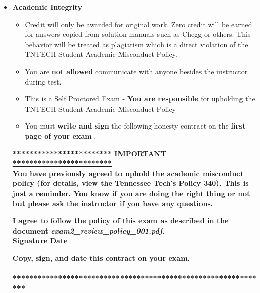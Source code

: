 \documentclass[11pt]{article}
\newcommand{\EXAMNUM}{2\hspace{0mm}}
\newcommand{\SECNUM}{001\hspace{0mm}}
\begin{document}
\begin{itemize}
\begin{itemize}
		\item  Pencil and scratch paper
			
	\end{itemize}

\newpage
		\item  \textbf{ \Large Academic Integrity}
\begin{itemize}

		\item {\B Credit will only be awarded for original work. Zero credit will be earned for answers copied from solution manuals such as Chegg or others. This behavior will be treated as plagiarism which is a direct violation of the TNTECH Student Academic Misconduct Policy.}

		\item  You are {\bf not allowed} communicate with anyone besides the instructor during test. 
		\item This is a Self Proctored Exam - {\bf You are responsible} for upholding the TNTECH Student Academic Misconduct Policy
		\item  You must {\bf write and sign} the following honesty contract on the {\bf first page of your exam }. 
		
		

\end{itemize}


 {\R  \bf \underline{************************ IMPORTANT ************************}} \vspace{3mm}\\
			  {\R \bf You have previously agreed to uphold the academic misconduct policy (for details, view the
Tennessee Tech's Policy 340). This is just a reminder. You know if you are doing the right thing or not but please ask the instructor if you have any questions. }
\begin{framed}
	
	\vspace{3mm}	 \textbf{ I \underline{\hspace{50mm}} agree to follow the policy of this exam \vspc as described in the document {\it exam\EXAMNUM\_review\_policy\_\SECNUM.pdf}.  }\vspace{3mm}\\
		 \textbf{\Large Signature \underline{\hspace{80mm}} Date\underline{\hspace{20mm} }}\\

\end{framed}
			{\R  \bf Copy, sign, and date this contract on your exam. }   \vspace{1mm}\\
			{\R  \bf \underline{\hspace{140mm}}} \\
			{\R  \bf ***************************************************************} 


\end{itemize}
\end{document}
